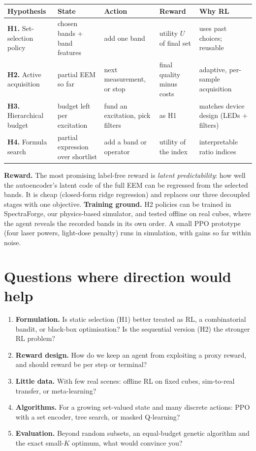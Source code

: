 \documentclass[11pt,a4paper]{article}
\begin{document}
\smallskip
\renewcommand{\arraystretch}{1.15}
\begin{tabularx}{\linewidth}{@{}>{\raggedright\arraybackslash}p{2.9cm} L L L L@{}}
\toprule
Hypothesis & State & Action & Reward & Why RL \\
\midrule
\textbf{H1.} Set-selection policy & chosen bands + band features & add one band & utility $U$ of final set & uses past choices; reusable \\
\textbf{H2.} Active acquisition & partial EEM so far & next measurement, or stop & final quality minus costs & adaptive, per-sample acquisition \\
\textbf{H3.} Hierarchical budget & budget left per excitation & fund an excitation, pick filters & as H1 & matches device design (LEDs + filters) \\
\textbf{H4.} Formula search & partial expression over shortlist & add a band or operator & utility of the index & interpretable ratio indices \\
\bottomrule
\end{tabularx}

\smallskip
\textbf{Reward.} The most promising label-free reward is \emph{latent predictability}: how well the autoencoder's latent code of the full EEM can be regressed from the selected bands. It is cheap (closed-form ridge regression) and replaces our three decoupled stages with one objective.
\textbf{Training ground.} H2 policies can be trained in SpectraForge, our physics-based simulator, and tested offline on real cubes, where the agent reveals the recorded bands in its own order. A small PPO prototype (four laser powers, light-dose penalty) runs in simulation, with gains so far within noise.

\section{Questions where direction would help}
\begin{enumerate}
\item \textbf{Formulation.} Is static selection (H1) better treated as RL, a combinatorial bandit, or black-box optimisation? Is the sequential version (H2) the stronger RL problem?
\item \textbf{Reward design.} How do we keep an agent from exploiting a proxy reward, and should reward be per step or terminal?
\item \textbf{Little data.} With few real scenes: offline RL on fixed cubes, sim-to-real transfer, or meta-learning?
\item \textbf{Algorithms.} For a growing set-valued state and many discrete actions: PPO with a set encoder, tree search, or masked Q-learning?
\item \textbf{Evaluation.} Beyond random subsets, an equal-budget genetic algorithm and the exact small-$K$ optimum, what would convince you?
\end{enumerate}
\end{document}
